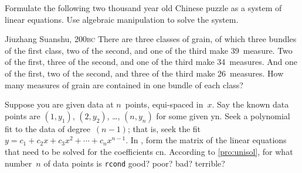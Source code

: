 \begin{exercise}  
Formulate the following two thousand year old Chinese puzzle as a system of linear equations.
Use algebraic manipulation to solve the system.
\begin{quoted}{Jiuzhang Suanshu, 200\textsc{bc} \cite[p.3]{Chartier2015}}
There are three classes of grain, of which three bundles of the first class, two of the second, and one of the third make 39~measure.
Two of the first, three of the second, and one of the third make 34~measures.
And one of the first, two of the second, and three of the third make 26~measures.
How many measures of grain are contained in one bundle of each class?
\end{quoted}
\end{exercise}



\begin{comment}
Could have project exercises to introduce sensitivity to small errors in applications (experimental computational maths).  
Although sensitivity is quantified in the section on condition number and rank.
\end{comment}





\begin{exercise}  
Suppose you are given data at \(n\)~points, equi-spaced in~\(x\).
Say the known data points are \((1,y_1)\), \((2,y_2)\), \ldots, \((n,y_n)\) for some given \hlist yn.
Seek a polynomial fit to the data of degree~\((n-1)\); that is, seek the fit \(y=c_1+c_2x+c_3x^2+\cdots+c_{n}x^{n-1}\).
In \script, form the matrix of the linear equations that need to be solved for the coefficients \hlist cn.  
According to \cref{pro:unisol}, for what number~\(n\) of data points is \verb|rcond| good? poor? bad? terrible? 
\end{exercise}




